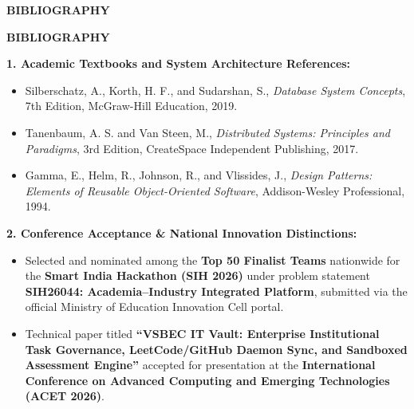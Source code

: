 \vspace*{\fill}
\begin{center}
  {\fontsize{18pt}{24pt}\selectfont\bfseries BIBLIOGRAPHY\par}
\end{center}
\vspace*{\fill}
\newpage

\begin{center}
  {\fontsize{16pt}{20pt}\selectfont\bfseries BIBLIOGRAPHY\par}
\end{center}
\vspace{0.8cm}

{\fontsize{13.5pt}{23pt}\selectfont
\noindent\textbf{1. Academic Textbooks and System Architecture References:}
\begin{itemize}[noitemsep,topsep=4pt,leftmargin=*]
  \item Silberschatz, A., Korth, H. F., and Sudarshan, S., \textit{Database System Concepts}, 7th Edition, McGraw-Hill Education, 2019.
  \item Tanenbaum, A. S. and Van Steen, M., \textit{Distributed Systems: Principles and Paradigms}, 3rd Edition, CreateSpace Independent Publishing, 2017.
  \item Gamma, E., Helm, R., Johnson, R., and Vlissides, J., \textit{Design Patterns: Elements of Reusable Object-Oriented Software}, Addison-Wesley Professional, 1994.
\end{itemize}

\vspace{0.5cm}
\noindent\textbf{2. Conference Acceptance \& National Innovation Distinctions:}
\begin{itemize}[noitemsep,topsep=4pt,leftmargin=*]
  \item Selected and nominated among the \textbf{Top 50 Finalist Teams} nationwide for the \textbf{Smart India Hackathon (SIH 2026)} under problem statement \textbf{SIH26044: Academia--Industry Integrated Platform}, submitted via the official Ministry of Education Innovation Cell portal.
  \item Technical paper titled \textbf{``VSBEC IT Vault: Enterprise Institutional Task Governance, LeetCode/GitHub Daemon Sync, and Sandboxed Assessment Engine''} accepted for presentation at the \textbf{International Conference on Advanced Computing and Emerging Technologies (ACET 2026)}.\par
\end{itemize}}
\newpage
